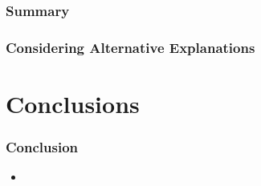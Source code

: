 \documentclass[dvipdfmx,12pt]{beamer}
\begin{document}
\begin{frame}\frametitle{}

\end{frame}

\begin{frame}\frametitle{Summary}

\end{frame}

\begin{frame}\frametitle{Considering Alternative Explanations}

\end{frame}

\section{Conclusions}
\begin{frame}\frametitle{Conclusion}
  \begin{itemize}
    \item
  \end{itemize}
\end{frame}
\end{document}

